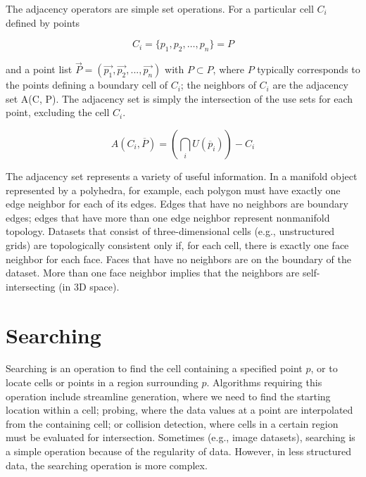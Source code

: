 The adjacency operators are simple set operations. For a particular cell $C_i$ defined by points

\begin{equation}\label{eq:8.24}
C_i = \lbrace p_1, p_2, \ldots, p_n \rbrace = P
\end{equation}

and a point list $\overrightarrow{P} = (\overrightarrow{p_1}, \overrightarrow{p_2}, ..., \overrightarrow{p_n})$  with $P \subset P$, where $P$ typically corresponds to the points defining a boundary cell of $C_i$; the neighbors of $C_i$ are the adjacency set A(C, P). The adjacency set is simply the intersection of the use sets for each point, excluding the cell $C_i$.

\begin{equation}\label{eq:8.25}
A(C_i, \overline{P}) = \left(\bigcap_{i} U(\overline{p}_i)\right) - C_i\end{equation}

The adjacency set represents a variety of useful information. In a manifold object represented by a polyhedra, for example, each polygon must have exactly one edge neighbor for each of its edges. Edges that have no neighbors are boundary edges; edges that have more than one edge neighbor represent nonmanifold topology. Datasets that consist of three-dimensional cells (e.g., unstructured grids) are topologically consistent only if, for each cell, there is exactly one face neighbor for each face. Faces that have no neighbors are on the boundary of the dataset. More than one face neighbor implies that the neighbors are self-intersecting (in 3D space).

\section{Searching}
\label{sec:searching}
Searching is an operation to find the cell containing a specified point $p$, or to locate cells or points in a region surrounding $p$.
Algorithms requiring this operation include streamline generation, where we need to find the starting location within a cell; probing, where the data values at a point are interpolated from the containing cell; or collision detection, where cells in a certain region must be evaluated for intersection.
Sometimes (e.g., image datasets), searching is a simple operation because of the regularity of data. However, in less structured data, the searching operation is more complex.

